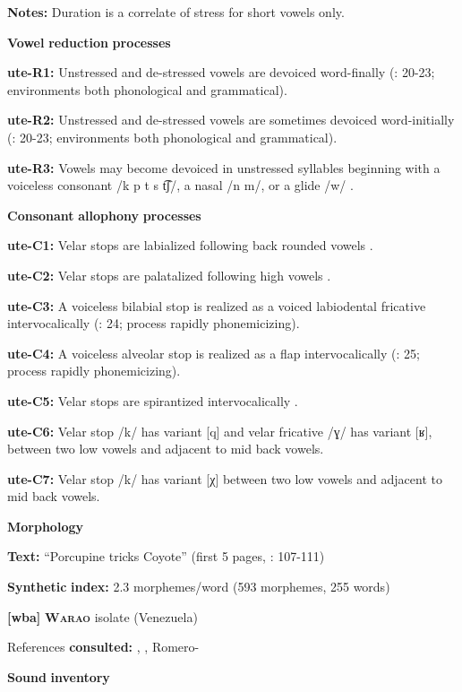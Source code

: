 \textbf{Notes:} Duration is a correlate of stress for short vowels only.

\textbf{Vowel} \textbf{reduction} \textbf{processes}

\textbf{ute-R1:} Unstressed and de-stressed vowels are devoiced word-finally (\citealt{Givón2011}: 20-23; environments both phonological and grammatical).

\textbf{ute-R2:} Unstressed and de-stressed vowels are sometimes devoiced word-initially (\citealt{Givón2011}: 20-23; environments both phonological and grammatical).

\textbf{ute-R3:} Vowels may become devoiced in unstressed syllables beginning with a voiceless consonant /k p t s t͡ʃ/, a nasal /n m/, or a glide /w/ \citep[21]{Givón2011}.

\textbf{Consonant} \textbf{allophony} \textbf{processes}

\textbf{ute-C1:} Velar stops are labialized following back rounded vowels \citep[29]{Givón2011}.

\textbf{ute-C2:} Velar stops are palatalized following high vowels \citep[29]{Givón2011}.

\textbf{ute-C3:} A voiceless bilabial stop is realized as a voiced labiodental fricative intervocalically (\citealt{Givón2011}: 24; process rapidly phonemicizing).

\textbf{ute-C4:} A voiceless alveolar stop is realized as a flap intervocalically (\citealt{Givón2011}: 25; process rapidly phonemicizing).

\textbf{ute-C5:} Velar stops are spirantized intervocalically \citep[26-7]{Givón2011}.

\textbf{ute-C6:} Velar stop /k/ has variant [q] and velar fricative /ɣ/ has variant [ʁ], between two low vowels and adjacent to mid back vowels.

\textbf{ute-C7:} Velar stop /k/ has variant [χ] between two low vowels and adjacent to mid back vowels.

\textbf{Morphology}

\textbf{Text:} “Porcupine tricks Coyote” (first 5 pages, \citealt{Givón2013}: 107-111)

\textbf{Synthetic} \textbf{index:} 2.3 morphemes/word (593 morphemes, 255 words)

\textbf{[wba]} \textbf{\textsc{Warao}}  isolate (Venezuela)

References \textbf{consulted:} \citet{Arinterol2000}, \citet{Osborn1966}, Romero-\citet{Figeroa1997}

\textbf{Sound} \textbf{inventory}

